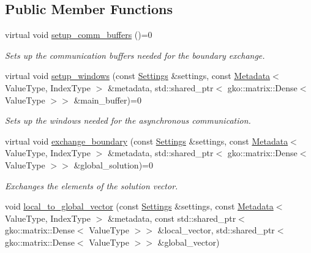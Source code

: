 \subsection*{Public Member Functions}
\begin{DoxyCompactItemize}
\item 
\mbox{\label{classschwz_1_1Communicate_a76b0d6b0571107ab2cd58e309902a666}} 
virtual void \hyperlink{classschwz_1_1Communicate_a76b0d6b0571107ab2cd58e309902a666}{setup\+\_\+comm\+\_\+buffers} ()=0
\begin{DoxyCompactList}\small\item\em Sets up the communication buffers needed for the boundary exchange. \end{DoxyCompactList}\item 
virtual void \hyperlink{classschwz_1_1Communicate_a13190372f3a6193f92226d08e822fde7}{setup\+\_\+windows} (const \hyperlink{structschwz_1_1Settings}{Settings} \&settings, const \hyperlink{structschwz_1_1Metadata}{Metadata}$<$ Value\+Type, Index\+Type $>$ \&metadata, std\+::shared\+\_\+ptr$<$ gko\+::matrix\+::\+Dense$<$ Value\+Type $>$$>$ \&main\+\_\+buffer)=0
\begin{DoxyCompactList}\small\item\em Sets up the windows needed for the asynchronous communication. \end{DoxyCompactList}\item 
virtual void \hyperlink{classschwz_1_1Communicate_a41794ecd95f7f7e590ae27bb6ca6e6e1}{exchange\+\_\+boundary} (const \hyperlink{structschwz_1_1Settings}{Settings} \&settings, const \hyperlink{structschwz_1_1Metadata}{Metadata}$<$ Value\+Type, Index\+Type $>$ \&metadata, std\+::shared\+\_\+ptr$<$ gko\+::matrix\+::\+Dense$<$ Value\+Type $>$$>$ \&global\+\_\+solution)=0
\begin{DoxyCompactList}\small\item\em Exchanges the elements of the solution vector. \end{DoxyCompactList}\item 
void \hyperlink{classschwz_1_1Communicate_a8c1ed0c5f86c458038b4062f57337d44}{local\+\_\+to\+\_\+global\+\_\+vector} (const \hyperlink{structschwz_1_1Settings}{Settings} \&settings, const \hyperlink{structschwz_1_1Metadata}{Metadata}$<$ Value\+Type, Index\+Type $>$ \&metadata, const std\+::shared\+\_\+ptr$<$ gko\+::matrix\+::\+Dense$<$ Value\+Type $>$$>$ \&local\+\_\+vector, std\+::shared\+\_\+ptr$<$ gko\+::matrix\+::\+Dense$<$ Value\+Type $>$$>$ \&global\+\_\+vector)

\end{DoxyCompactItemize}
